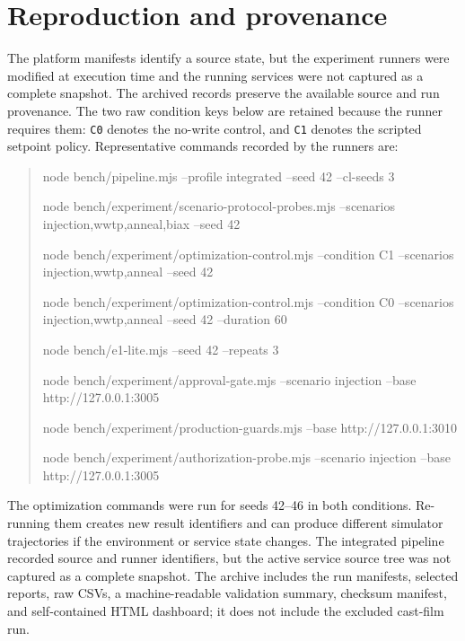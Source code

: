 \documentclass[10pt]{article}
\begin{document}
\section*{Reproduction and provenance}
The platform manifests identify a source state, but the experiment runners were modified at execution time and the running services were not captured as a complete snapshot. The archived records preserve the available source and run provenance. The two raw condition keys below are retained because the runner requires them: \texttt{C0} denotes the no-write control, and \texttt{C1} denotes the scripted setpoint policy. Representative commands recorded by the runners are:
\begin{quote}
\footnotesize\ttfamily\raggedright
node bench/pipeline.mjs --profile integrated --seed 42 --cl-seeds 3\par\smallskip
node bench/experiment/scenario-protocol-probes.mjs --scenarios injection,wwtp,anneal,biax --seed 42\par\smallskip
node bench/experiment/optimization-control.mjs --condition C1 --scenarios injection,wwtp,anneal --seed 42\par\smallskip
node bench/experiment/optimization-control.mjs --condition C0 --scenarios injection,wwtp,anneal --seed 42 --duration 60\par\smallskip
node bench/e1-lite.mjs --seed 42 --repeats 3\par\smallskip
node bench/experiment/approval-gate.mjs --scenario injection --base http://127.0.0.1:3005\par\smallskip
node bench/experiment/production-guards.mjs --base http://127.0.0.1:3010\par\smallskip
node bench/experiment/authorization-probe.mjs --scenario injection --base http://127.0.0.1:3005
\end{quote}
The optimization commands were run for seeds 42--46 in both conditions. Re-running them creates new result identifiers and can produce different simulator trajectories if the environment or service state changes. The integrated pipeline recorded source and runner identifiers, but the active service source tree was not captured as a complete snapshot. The archive includes the run manifests, selected reports, raw CSVs, a machine-readable validation summary, checksum manifest, and self-contained HTML dashboard; it does not include the excluded cast-film run.



\end{document}
